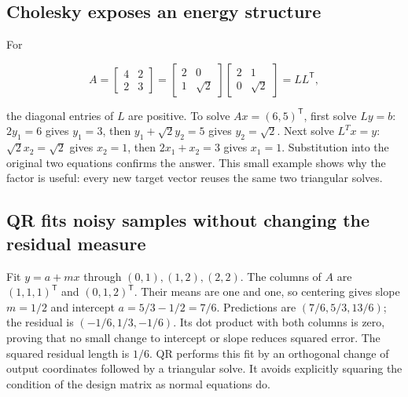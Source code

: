 \subsection{Cholesky exposes an energy structure}\label{02-foundations-ii-ch038-cholesky-exposes-an-energy-structure}

\hypertarget{02-foundations-ii-ch038-cholesky-exposes-an-energy-structure}{}

For

\[
A=\begin{bmatrix}4&2\\2&3\end{bmatrix}
=\begin{bmatrix}2&0\\1&\sqrt2\end{bmatrix}
\begin{bmatrix}2&1\\0&\sqrt2\end{bmatrix}=LL^\mathsf T,
\]

the diagonal entries of \(L\) are positive. To solve \(Ax=(6,5)^\mathsf T\), first solve \(Ly=b\): \(2y_1=6\) gives \(y_1=3\), then \(y_1+\sqrt2y_2=5\) gives \(y_2=\sqrt2\). Next solve \(L^Tx=y\): \(\sqrt2x_2=\sqrt2\) gives \(x_2=1\), then \(2x_1+x_2=3\) gives \(x_1=1\). Substitution into the original two equations confirms the answer. This small example shows why the factor is useful: every new target vector reuses the same two triangular solves.

\subsection{QR fits noisy samples without changing the residual measure}\label{02-foundations-ii-ch038-qr-fits-noisy-samples-without-changing-the-residual-measure}

\hypertarget{02-foundations-ii-ch038-qr-fits-noisy-samples-without-changing-the-residual-measure}{}

Fit \(y=a+mx\) through \((0,1),(1,2),(2,2)\). The columns of \(A\) are \((1,1,1)^\mathsf T\) and \((0,1,2)^\mathsf T\). Their means are one and one, so centering gives slope \(m=1/2\) and intercept \(a=5/3-1/2=7/6\). Predictions are \((7/6,5/3,13/6)\); the residual is \((-1/6,1/3,-1/6)\). Its dot product with both columns is zero, proving that no small change to intercept or slope reduces squared error. The squared residual length is \(1/6\). QR performs this fit by an orthogonal change of output coordinates followed by a triangular solve. It avoids explicitly squaring the condition of the design matrix as normal equations do.

